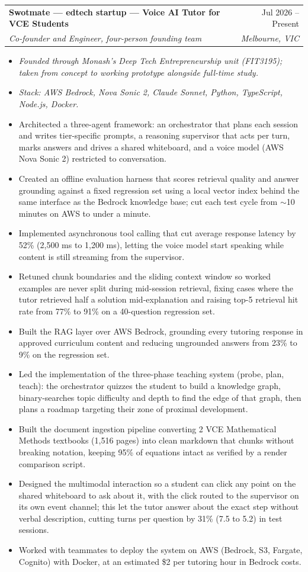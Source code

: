 \documentclass[letterpaper,11pt]{article}
\makeatletter
\newcommand{\resumeItem}[1]{\item\small{{#1 \vspace{-2pt}}}}
\newcommand{\resumeSubheading}[4]{
  \vspace{-2pt}\item
    \begin{tabular*}{0.97\textwidth}[t]{l@{\extracolsep{\fill}}r}
      \textbf{#1} & #2 \\
      \textit{\small#3} & \textit{\small #4} \\
    \end{tabular*}\vspace{-7pt}
}
\newcommand{\resumeNote}[1]{\item[]\small{\textit{#1}}\vspace{-2pt}}
\newcommand{\resumeItemListStart}{\begin{itemize}}
\newcommand{\resumeItemListEnd}{\end{itemize}\vspace{-5pt}}
\makeatother
\begin{document}
    \resumeSubheading
      {Swotmate --- edtech startup --- Voice AI Tutor for VCE Students}{Jul 2026 -- Present}
      {Co-founder and Engineer, four-person founding team}{Melbourne, VIC}
      \resumeItemListStart
        \resumeNote{Founded through Monash's Deep Tech Entrepreneurship unit (FIT3195); taken from concept to working prototype alongside full-time study.}
        \resumeNote{Stack: AWS Bedrock, Nova Sonic 2, Claude Sonnet, Python, TypeScript, Node.js, Docker.}
        \resumeItem{Architected a three-agent framework: an orchestrator that plans each session and writes tier-specific prompts, a reasoning supervisor that acts per turn, marks answers and drives a shared whiteboard, and a voice model (AWS Nova Sonic 2) restricted to conversation.}
        \resumeItem{Created an offline evaluation harness that scores retrieval quality and answer grounding against a fixed regression set using a local vector index behind the same interface as the Bedrock knowledge base; cut each test cycle from $\sim$10 minutes on AWS to under a minute.}
        \resumeItem{Implemented asynchronous tool calling that cut average response latency by 52\% (2,500 ms to 1,200 ms), letting the voice model start speaking while content is still streaming from the supervisor.}
        \resumeItem{Retuned chunk boundaries and the sliding context window so worked examples are never split during mid-session retrieval, fixing cases where the tutor retrieved half a solution mid-explanation and raising top-5 retrieval hit rate from 77\% to 91\% on a 40-question regression set.}
        \resumeItem{Built the RAG layer over AWS Bedrock, grounding every tutoring response in approved curriculum content and reducing ungrounded answers from 23\% to 9\% on the regression set.}
        \resumeItem{Led the implementation of the three-phase teaching system (probe, plan, teach): the orchestrator quizzes the student to build a knowledge graph, binary-searches topic difficulty and depth to find the edge of that graph, then plans a roadmap targeting their zone of proximal development.}
        \resumeItem{Built the document ingestion pipeline converting 2 VCE Mathematical Methods textbooks (1,516 pages) into clean markdown that chunks without breaking notation, keeping 95\% of equations intact as verified by a render comparison script.}
        \resumeItem{Designed the multimodal interaction so a student can click any point on the shared whiteboard to ask about it, with the click routed to the supervisor on its own event channel; this let the tutor answer about the exact step without verbal description, cutting turns per question by 31\% (7.5 to 5.2) in test sessions.}
        \resumeItem{Worked with teammates to deploy the system on AWS (Bedrock, S3, Fargate, Cognito) with Docker, at an estimated \$2 per tutoring hour in Bedrock costs.}
      \resumeItemListEnd
\end{document}
